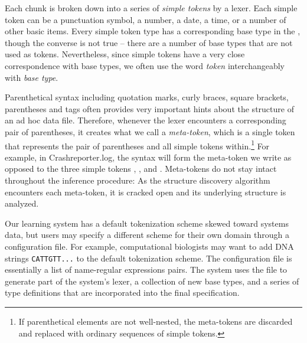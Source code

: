 Each chunk is broken down into a series of {\em simple tokens} by a lexer.
Each simple token can be a punctuation symbol, a number, a date, a time, or a
number of other basic items.  Every simple token type has a corresponding
base type in the \ir{}, though the converse is not true -- there are a
number of base types that are not used as tokens.  Nevertheless, since
simple tokens have a very close correspondence with base types,
we often use the word {\em token} interchangeably with {\em base type}.
  
Parenthetical syntax including quotation marks, curly braces, square brackets,
parentheses and \xml{} tags
often provides very important hints about the structure
of an ad hoc data file.  Therefore, whenever the lexer encounters 
a corresponding pair of parentheses, it 
creates what we call a {\em meta-token}, which is a single token that
represents the pair of parentheses and all simple tokens 
within.\footnote{If parenthetical elements
are not well-nested, the meta-tokens are discarded and replaced with
ordinary sequences of simple tokens.}  For example, in Crashreporter.log,
the syntax \cd{[2164]} will form the meta-token we write \cd{[*]} as
opposed to the three simple tokens \cd{[}, , and \cd{]}.  Meta-tokens
do not stay intact throughout the inference procedure:  As the structure 
discovery algorithm encounters each meta-token, it is cracked open and its 
underlying structure is analyzed.

Our learning system has a default tokenization scheme skewed toward systems
data, but users may specify a different scheme for their own domain
through a configuration file.  For example, computational biologists
may want to add DNA strings {\tt CATTGTT...} to the default tokenization 
scheme.  The configuration file is essentially
a list of name-regular expressions pairs.  The system uses the 
file to generate part of the system's lexer, a
collection of new \ir{} base types, and a series of type 
definitions that are incorporated into the final \pads{} specification.  


